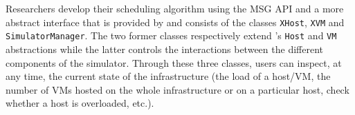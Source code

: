 Researchers develop their scheduling algorithm using the \sg
MSG API and a more abstract interface that is provided by \vmps
and consists of the classes \texttt{XHost}, \texttt{XVM} and
\texttt{SimulatorManager}. The two former classes respectively
extend \sg's \texttt{Host} and \texttt{VM} abstractions while the
latter controls the interactions between the different components of
the simulator.  Through these three classes, users can
inspect, at any time, the current state of the infrastructure (\ie the
load of a host/VM, the number of VMs hosted on the whole
infrastructure or on a particular host, check whether a host is
overloaded, etc.).




